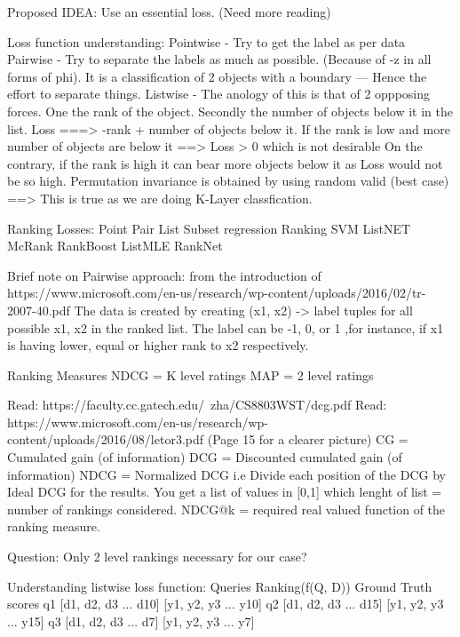 \documentclass[11pt]{report}
\begin{document}
Proposed IDEA:
    Use an essential loss. (Need more reading)

Loss function understanding:
Pointwise - Try to get the label as per data
Pairwise - Try to separate the labels as much as possible. (Because of -z in all forms of phi).
           It is a classification of 2 objects with a boundary --- Hence the effort to separate things.
Listwise - The anology of this is that of 2 oppposing forces. One the rank of the object. Secondly
           the number of objects below it in the list.
           Loss ===> -rank + number of objects below it.
                If the rank is low and more number of objects are below it ==> Loss > 0 which is not desirable
                On the contrary, if the rank is high it can bear more objects below it as Loss would not be so high.
           Permutation invariance is obtained by using random valid (best case)
        ==> This is true as we are doing K-Layer classfication.


Ranking Losses:
    Point               Pair            List
    Subset regression   Ranking SVM     ListNET
    McRank              RankBoost       ListMLE
                        RankNet

Brief note on Pairwise approach: from the introduction of https://www.microsoft.com/en-us/research/wp-content/uploads/2016/02/tr-2007-40.pdf
    The data is created by creating (x1, x2) -> label tuples for all possible x1, x2 in the ranked list. The label can be -1, 0, or 1
    ,for instance, if x1 is having lower, equal or higher rank to x2 respectively.

Ranking Measures
    NDCG = K level ratings
    MAP = 2 level ratings

    Read: https://faculty.cc.gatech.edu/~zha/CS8803WST/dcg.pdf
    Read: https://www.microsoft.com/en-us/research/wp-content/uploads/2016/08/letor3.pdf (Page 15 for a clearer picture)
        CG = Cumulated gain (of information)
        DCG = Discounted cumulated gain (of information)
        NDCG = Normalized DCG i.e Divide each position of the DCG by Ideal DCG for the results.
               You get a list of values in [0,1] which lenght of list = number of rankings considered.
        NDCG@k = required real valued function of the ranking measure.

    Question: Only 2 level rankings necessary for our case?

Understanding listwise loss function:
    Queries       Ranking(f(Q, D))      Ground Truth scores
    q1        [d1, d2, d3 ... d10]      [y1, y2, y3 ... y10]
    q2        [d1, d2, d3 ... d15]      [y1, y2, y3 ... y15]
    q3        [d1, d2, d3 ... d7]       [y1, y2, y3 ... y7]
\end{document}
